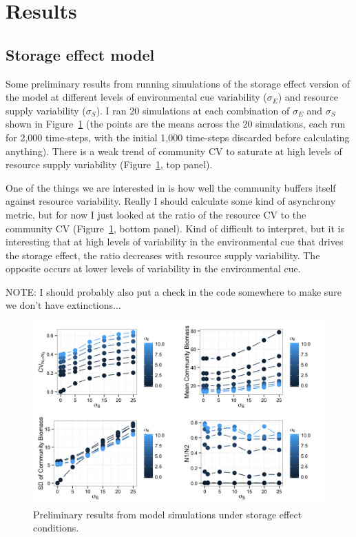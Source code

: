 \documentclass[12pt]{article}
\begin{document}
\section{Results}
\subsection{Storage effect model}
Some preliminary results from running simulations of the storage effect version of the model at different levels of environmental cue variability ($\sigma_{E}$) and resource supply variability ($\sigma_{S}$). I ran 20 simulations at each combination of $\sigma_{E}$ and $\sigma_{S}$ shown in Figure~\ref{fig:storeEffSims} (the points are the means across the 20 simulations, each run for 2,000 time-steps, with the initial 1,000 time-steps discarded before calculating anything). There is a weak trend of community CV to saturate at high levels of resource supply variability (Figure~\ref{fig:storeEffSims}, top panel). 

One of the things we are interested in is how well the community buffers itself against resource variability. Really I should calculate some kind of asynchrony metric, but for now I just looked at the ratio of the resource CV to the community CV (Figure~\ref{fig:storeEffSims}, bottom panel). Kind of difficult to interpret, but it is interesting that at high levels of variability in the environmental cue that drives the storage effect, the ratio decreases with resource supply variability. The opposite occurs at lower levels of variability in the environmental cue.

NOTE: I should probably also put a check in the code somewhere to make sure we don't have extinctions...

\begin{figure}
\centering
\includegraphics[width=1\textwidth]{"CV_FourPanel"}
\caption{Preliminary results from model simulations under storage effect conditions.}
 \label{fig:storeEffSims}
\end{figure}
\end{document}
